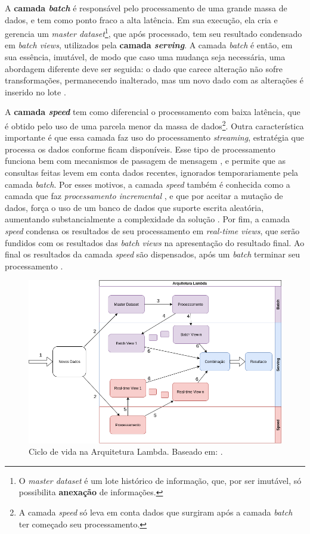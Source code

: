 A \textbf{camada \textit{batch}} é responsável pelo processamento de uma grande
massa de dados, e tem como ponto fraco a alta latência. Em sua execução, ela
cria e gerencia um \textit{master dataset}\footnote{O \textit{master dataset} é um lote
histórico de informação, que, por ser imutável, só possibilita \textbf{anexação}
de informações.}, que após processado, tem seu resultado condensado em
\textit{batch views}, utilizados pela \textbf{camada \textit{serving}}.
A camada \textit{batch} é então, em sua essência, imutável, de modo que caso
uma mudança seja necessária, uma abordagem diferente deve ser seguida: o dado
que carece alteração não sofre transformações, permanecendo inalterado, mas um
novo dado com as alterações é inserido no lote \cite{marz2015}.

A \textbf{camada \textit{speed}} tem como diferencial o processamento com baixa
latência, que é obtido pelo uso de uma parcela menor da massa de dados\footnote{
A camada \textit{speed} só leva em conta dados que surgiram após a camada
\textit{batch} ter começado seu processamento.}. Outra característica importante
é que essa camada faz uso do processamento \textit{streaming}, estratégia que
processa os dados conforme ficam disponíveis. Esse tipo de
processamento funciona bem com mecanismos de passagem de mensagem
\cite{marz2015}, e permite que as consultas feitas levem em conta dados
recentes, ignorados temporariamente pela camada \textit{batch}. Por esses
motivos, a camada \textit{speed} também é conhecida como a camada que faz
\textit{processamento incremental} \cite{marz2015}, e que por aceitar a mutação
de dados, força o uso de um banco de dados que suporte escrita aleatória,
aumentando substancialmente a complexidade da solução \cite{marz2015}. Por
fim, a camada \textit{speed} condensa os resultados de seu processamento em
\textit{real-time views}, que serão fundidos com os resultados das
\textit{batch views} na apresentação do resultado final. Ao final os resultados
da camada \textit{speed} são dispensados, após um \textit{batch} terminar seu
processamento \cite{marz2015}.

\begin{figure}[hbt]
  \centering
    \includegraphics[width=\textwidth]{figuras/lambda-lifecycle.png}
    \caption{Ciclo de vida na Arquitetura Lambda. Baseado em: .}
  \label{fig:lambda-lifecycle}
\end{figure}

